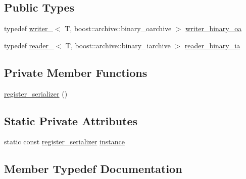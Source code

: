 \subsection*{Public Types}
\begin{DoxyCompactItemize}
\item 
typedef \hyperlink{structecto_1_1serialization_1_1writer__}{writer\+\_\+}$<$ T, boost\+::archive\+::binary\+\_\+oarchive $>$ \hyperlink{structecto_1_1serialization_1_1register__serializer_a31c9f04624076aa209e66232a511c627}{writer\+\_\+binary\+\_\+oa}
\item 
typedef \hyperlink{structecto_1_1serialization_1_1reader__}{reader\+\_\+}$<$ T, boost\+::archive\+::binary\+\_\+iarchive $>$ \hyperlink{structecto_1_1serialization_1_1register__serializer_a7783674d19bdb5a7f2143953d6a7302f}{reader\+\_\+binary\+\_\+ia}
\end{DoxyCompactItemize}
\subsection*{Private Member Functions}
\begin{DoxyCompactItemize}
\item 
\hyperlink{structecto_1_1serialization_1_1register__serializer_ae339eb881e0afbb36bff03a34263c683}{register\+\_\+serializer} ()
\end{DoxyCompactItemize}
\subsection*{Static Private Attributes}
\begin{DoxyCompactItemize}
\item 
static const \hyperlink{structecto_1_1serialization_1_1register__serializer}{register\+\_\+serializer} \hyperlink{structecto_1_1serialization_1_1register__serializer_a742ed82697621237f599631009e47e05}{instance}
\end{DoxyCompactItemize}


\subsection{Member Typedef Documentation}
\hypertarget{structecto_1_1serialization_1_1register__serializer_a7783674d19bdb5a7f2143953d6a7302f}{}
